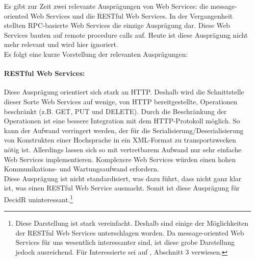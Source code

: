 \documentclass[runningheads]{llncs}
\newcommand{\germanquote}[1]{\glqq{}#1\grqq{}}
\newcommand{\decidr}{DecidR}
\begin{document}
    Es gibt zur Zeit zwei relevante Ausprägungen von Web Services: die
    \germanquote{message-oriented Web Services} und die \germanquote{RESTful Web Services}. In der
    Vergangenheit stellten RPC-basierte Web Services die einzige Ausprägung dar. Diese Web Services
    bauten auf \germanquote{remote procedure calls} auf. Heute ist diese Ausprägung nicht mehr
    relevant und wird hier ignoriert.\\
    Es folgt eine kurze Vorstellung der relevanten Ausprägungen:

    \paragraph{RESTful Web Services:}
      Diese Ausprägung orientiert sich stark an HTTP. Deshalb wird die Schnittstelle dieser Sorte
      Web Services auf wenige, von HTTP bereitgestellte, Operationen beschränkt (z.B. GET, PUT und
      DELETE). Durch die Beschränkung der Operationen ist eine bessere Integration mit dem
      HTTP-Protokoll möglich. So kann der Aufwand verringert werden, der für die
      Serialisierung/Deserialisierung von Konstrukten einer Hochsprache in ein XML-Format zu
      transportzwecken nötig ist. Allerdings lassen sich so mit vertretbarem Aufwand nur sehr
      einfache Web Services implementieren. Komplexere Web Services würden einen hohen
      Kommunikations- und Wartungsaufwand erfordern.\\
      Diese Ausprägung ist nicht standardisiert, was dazu führt, dass nicht ganz klar ist, was
      einen RESTful Web Service ausmacht. Somit ist diese Ausprägung für \decidr{}
      uninteressant.\footnote{Diese Darstellung ist stark vereinfacht. Deshalb sind einige der
      Möglichkeiten der RESTful Web Services unterschlagen worden. Da message-oriented Web Services
      für uns wesentlich interessanter sind, ist diese grobe Darstellung jedoch ausreichend. Für
      Interessierte sei auf \cite{paper_pautasso}, Abschnitt 3 verwiesen.}
\end{document}
